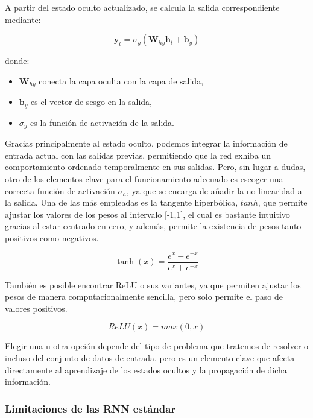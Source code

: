 A partir del estado oculto actualizado, se calcula la salida correspondiente mediante:

\begin{equation}
	\mathbf{y}_t = \sigma_y(\mathbf{W}_{hy} \mathbf{h}_t + \mathbf{b}_y)
\end{equation}

donde:
\begin{itemize}
	\item \( \mathbf{W}_{hy} \) conecta la capa oculta con la capa de salida,
	\item \( \mathbf{b}_y \) es el vector de sesgo en la salida,
	\item \textbf{\( \sigma_y \)} es la función de activación de la salida.
\end{itemize}

Gracias principalmente al estado oculto, podemos integrar la información de entrada actual con las salidas previas, permitiendo que la red exhiba un comportamiento ordenado temporalmente en sus salidas. Pero, sin lugar a dudas, otro de los elementos clave para el funcionamiento adecuado es escoger una correcta función de activación \( \sigma_h \), ya que se encarga de añadir la no linearidad a la salida. Una de las más empleadas es la tangente hiperbólica, $tanh$, que permite ajustar los valores de los pesos al intervalo [-1,1], el cual es bastante intuitivo gracias al estar centrado en cero, y además, permite la existencia de pesos tanto positivos como negativos.

\begin{equation}
	\tanh(x) = \frac{e^x - e^{-x}}{e^x + e^{-x}}
\end{equation}
  
 También es posible encontrar ReLU o sus variantes, ya que permiten ajustar los pesos de manera computacionalmente sencilla, pero solo permite el paso de valores positivos. 
 
 \begin{equation}
 	ReLU(x) = max(0, x)
 	\label{eq:relu}
 \end{equation}

Elegir una u otra opción depende del tipo de problema que tratemos de resolver o incluso del conjunto de datos de entrada, pero es un elemento clave que afecta directamente al aprendizaje de los estados ocultos y la propagación de dicha información.

\subsubsection{Limitaciones de las RNN estándar}

